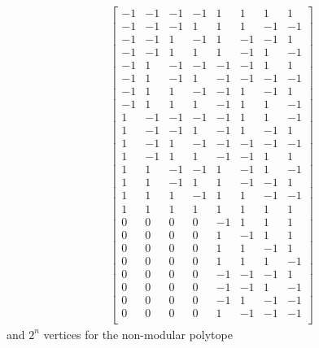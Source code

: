 \begin{equation}
\begin{aligned}\label{eq:modvertexp}
\begin{bmatrix}
  -1 & -1 & -1 & -1 & 1 & 1 & 1 & 1\\
  -1 & -1 & -1 & 1 & 1 & 1 & -1 & -1\\
  -1 & -1 & 1 & -1 & 1 & -1 & -1 & 1\\
  -1 & -1 & 1 & 1 & 1 & -1 & 1 & -1\\
  -1 & 1 & -1 & -1 & -1 & -1 & 1 & 1\\
  -1 & 1 & -1 & 1 & -1 & -1 & -1 & -1\\
  -1 & 1 & 1 & -1 & -1 & 1 & -1 & 1\\
  -1 & 1 & 1 & 1 & -1 & 1 & 1 & -1\\
  1 & -1 & -1 & -1 & -1 & 1 & 1 & -1\\
  1 & -1 & -1 & 1 & -1 & 1 & -1 & 1\\
  1 & -1 & 1 & -1 & -1 & -1 & -1 & -1\\
  1 & -1 & 1 & 1 & -1 & -1 & 1 & 1\\
  1 & 1 & -1 & -1 & 1 & -1 & 1 & -1\\
  1 & 1 & -1 & 1 & 1 & -1 & -1 & 1\\
  1 & 1 & 1 & -1 & 1 & 1 & -1 & -1\\
  1 & 1 & 1 & 1 & 1 & 1 & 1 & 1\\
  0 & 0 & 0 & 0 & -1 & 1 & 1 & 1\\
  0 & 0 & 0 & 0 & 1 & -1 & 1 & 1\\
  0 & 0 & 0 & 0 & 1 & 1 & -1 & 1\\
  0 & 0 & 0 & 0 & 1 & 1 & 1 & -1\\
  0 & 0 & 0 & 0 & -1 & -1 & -1 & 1\\
  0 & 0 & 0 & 0 & -1 & -1 & 1 & -1\\
  0 & 0 & 0 & 0 & -1 & 1 & -1 & -1\\
  0 & 0 & 0 & 0 & 1 & -1 & -1 & -1\\
\end{bmatrix}
\end{aligned}
\end{equation}
and $2^n$ vertices for the non-modular polytope
